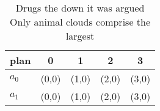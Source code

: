 \documentclass[a4paper]{article}
\begin{document}
\begin{table}
\begin{adjustbox}{width=0.5\columnwidth}
\begin{tabular}{|l|l|l|l|l|}
\hline
\textbf{plan} & \multicolumn{1}{c|}{\textbf{0}} & \multicolumn{1}{c|}{\textbf{1}} & \multicolumn{1}{c|}{\textbf{2}} & \multicolumn{1}{c|}{\textbf{3}} \\ \hline
\textbf{$a_0$}  & (0,0) & (1,0) & (2,0) & (3,0) \\ \hline
\textbf{$a_1$}  & (0,0) & (1,0) & (2,0) & (3,0) \\ \hline
\end{tabular}
\end{adjustbox}
\caption{Drugs the down it was argued Only animal clouds comprise the largest 
}
\end{table}
\end{document}
